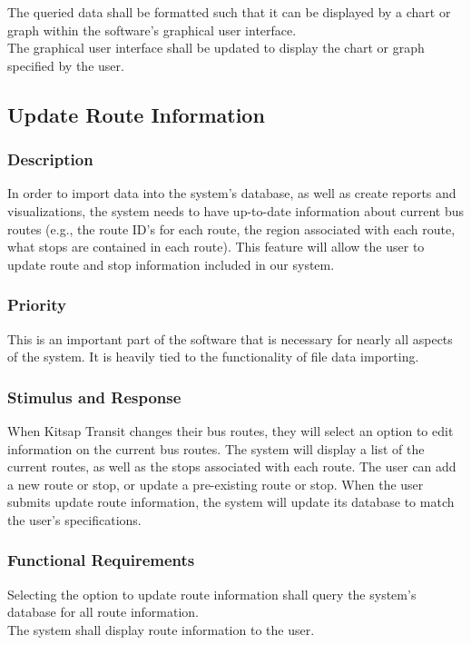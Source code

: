 The queried data shall be formatted such that it can be displayed by a chart or graph within the software's graphical user interface.\\

The graphical user interface shall be updated to display the chart or graph specified by the user.

\subsection{Update Route Information}
\subsubsection{Description}
In order to import data into the system's database, as well as create reports and visualizations, the system needs to have up-to-date information about current bus routes (e.g., the route ID's for each route, the region associated with each route, what stops are contained in each route). This feature will allow the user to update route and stop information included in our system. 

\subsubsection{Priority}
This is an important part of the software that is necessary for nearly all aspects of the system. It is heavily tied to the functionality of file data importing.

\subsubsection{Stimulus and Response}
When Kitsap Transit changes their bus routes, they will select an option to edit information on the current bus routes. The system will display a list of the current routes, as well as the stops associated with each route. The user can add a new route or stop, or update a pre-existing route or stop. When the user submits update route information, the system will update its database to match the user's specifications.

\subsubsection{Functional Requirements}
Selecting the option to update route information shall query the system's database for all route information.\\
The system shall display route information to the user.\\

